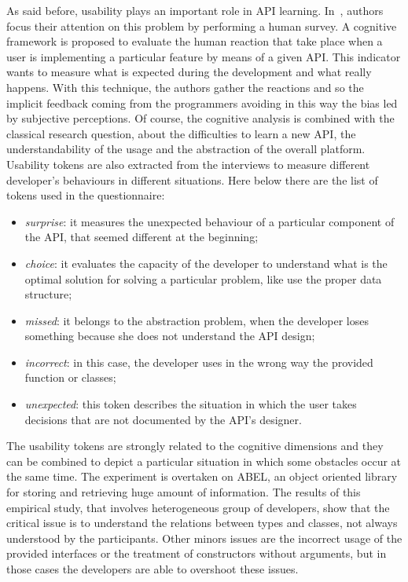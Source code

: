 \smallskip
As said before, usability plays an important role in API learning. 
In~\cite{marco_piccioni_empirical_2013},  authors focus their attention on this 
problem by performing a human survey. A cognitive framework is proposed to 
evaluate the human reaction that take place when a user is implementing a 
particular feature by means of a given API. This indicator wants to measure 
what is expected during the development and what really happens. With this 
technique, the authors gather the reactions and so the implicit feedback coming 
from the programmers avoiding in this way the bias led by subjective 
perceptions. Of course, the cognitive analysis is combined with the classical 
research question, about the difficulties to learn a new API, the 
understandability of the usage and the abstraction of the overall platform. 
Usability tokens are also extracted from the interviews to measure different 
developer's behaviours in different situations. Here below there are the list 
of tokens used in the questionnaire:

\begin{itemize}
	\item \textit{surprise}: it measures the unexpected behaviour of a 
	particular component of the API, that seemed different at the beginning;
	\item \textit{choice}: it evaluates the capacity of the developer to 
	understand what is the optimal solution for solving a particular problem, 
	like use the proper data structure;
	\item \textit{missed}: it belongs to the abstraction problem, when the 
	developer loses something because she does not understand the API design;
	\item \textit{incorrect}: in this case, the developer uses in the wrong way 
	the provided function or classes;
	\item \textit{unexpected}: this token describes the situation in which the 
	user takes decisions that are not documented by the API's designer.
\end{itemize}

The usability tokens are strongly related to the cognitive dimensions and they 
can be combined to depict a particular situation in which some obstacles occur 
at the same time. The experiment is overtaken on ABEL, an object oriented 
library for storing and retrieving huge amount of information. The results of 
this empirical study, that involves heterogeneous group of developers, show 
that the critical issue is to understand the relations between types and 
classes, not always understood by the participants. Other minors issues are the 
incorrect usage of the provided interfaces or the treatment of constructors 
without arguments, but in those cases the developers are able to overshoot 
these issues. 

